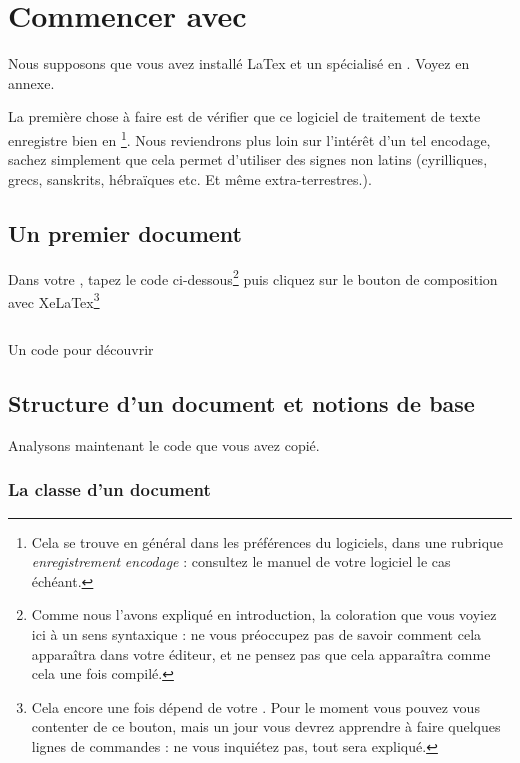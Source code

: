 \chapter{Commencer avec }

\begin{prealable}
Nous supposons que vous avez installé LaTex et un  spécialisé en . Voyez en annexe.

La première chose à faire est de vérifier que ce logiciel de traitement de texte enregistre bien en \footnote{Cela se trouve en général dans les préférences du logiciels, dans une rubrique \emph{enregistrement} \emph{encodage} : consultez le manuel de votre logiciel le cas échéant.}. Nous reviendrons plus loin sur l'intérêt d'un tel encodage, sachez simplement que cela permet d'utiliser des signes non latins (cyrilliques, grecs, sanskrits, hébraïques etc. Et même extra-terrestres.).

\end{prealable}

\section{Un premier document}

Dans votre , tapez le code ci-dessous\footnote{Comme nous l'avons expliqué en introduction, la coloration que vous voyiez ici à un sens syntaxique : ne vous préoccupez pas de savoir comment cela apparaîtra dans votre éditeur, et ne pensez pas que cela apparaîtra comme cela une fois compilé.} puis cliquez sur le bouton de composition avec XeLaTex\footnote{Cela encore une fois dépend de votre . Pour le moment vous pouvez vous contenter de ce bouton, mais un jour vous devrez apprendre à faire quelques lignes de commandes : ne vous inquiétez pas, tout sera expliqué.}

\begin{listing}
\inputminted{latex}{exemples/premierpas/structure/1.tex}


\caption{Un code pour découvrir }
\end{listing}



\section{Structure d'un document  et notions de base}

Analysons maintenant le code que vous avez copié.

\subsection{La classe d'un document}
